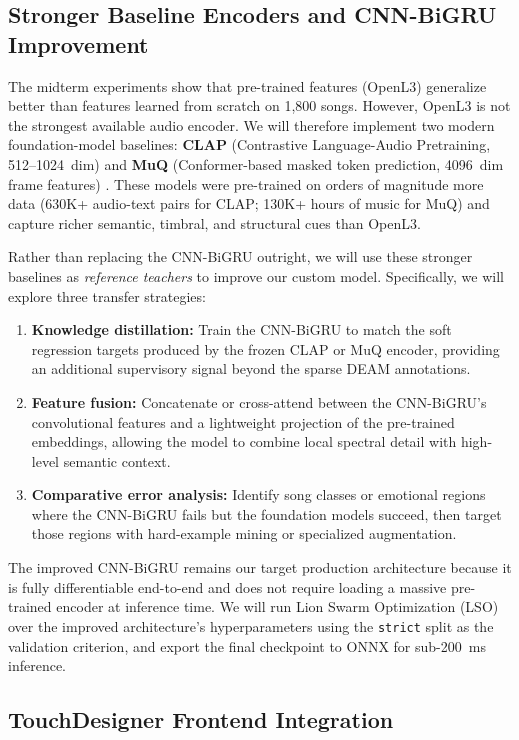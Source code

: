 \documentclass[12pt,a4paper]{article}
\begin{document}
\subsection{Stronger Baseline Encoders and CNN-BiGRU Improvement}

The midterm experiments show that pre-trained features (OpenL3) generalize better than features learned from scratch on 1,800 songs. However, OpenL3 is not the strongest available audio encoder. We will therefore implement two modern foundation-model baselines: \textbf{CLAP} (Contrastive Language-Audio Pretraining, 512--1024~dim) \cite{clap2023} and \textbf{MuQ} (Conformer-based masked token prediction, 4096~dim frame features) \cite{muq2025}. These models were pre-trained on orders of magnitude more data (630K+ audio-text pairs for CLAP; 130K+ hours of music for MuQ) and capture richer semantic, timbral, and structural cues than OpenL3.

Rather than replacing the CNN-BiGRU outright, we will use these stronger baselines as \textit{reference teachers} to improve our custom model. Specifically, we will explore three transfer strategies:
\begin{enumerate}
    \item \textbf{Knowledge distillation:} Train the CNN-BiGRU to match the soft regression targets produced by the frozen CLAP or MuQ encoder, providing an additional supervisory signal beyond the sparse DEAM annotations.
    \item \textbf{Feature fusion:} Concatenate or cross-attend between the CNN-BiGRU's convolutional features and a lightweight projection of the pre-trained embeddings, allowing the model to combine local spectral detail with high-level semantic context.
    \item \textbf{Comparative error analysis:} Identify song classes or emotional regions where the CNN-BiGRU fails but the foundation models succeed, then target those regions with hard-example mining or specialized augmentation.
\end{enumerate}
The improved CNN-BiGRU remains our target production architecture because it is fully differentiable end-to-end and does not require loading a massive pre-trained encoder at inference time. We will run Lion Swarm Optimization (LSO) over the improved architecture's hyperparameters using the \texttt{strict} split as the validation criterion, and export the final checkpoint to ONNX for sub-200~ms inference.

\subsection{TouchDesigner Frontend Integration}
\end{document}
